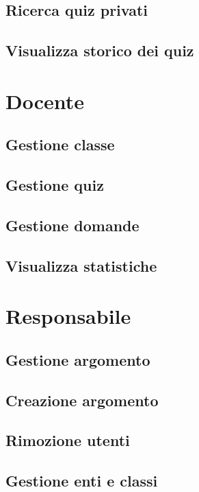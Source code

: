 \documentclass[a4paper, titlepage]{article}
\begin{document}
	 \subsection{Ricerca quiz privati}
	 
	 \subsection{Visualizza storico dei quiz}
	 
	 
	 \section{Docente}
	 
	 \subsection{Gestione classe}
	 
	 \subsection{Gestione quiz}
	 
	 \subsection{Gestione domande}
	 
	 \subsection{Visualizza statistiche}
	 
	 
	 \section{Responsabile}
	 
	 \subsection{Gestione argomento}
	 
	 \subsection{Creazione argomento}
	 
	 \subsection{Rimozione utenti}
	 
	 \subsection{Gestione enti e classi}
	 
	
\end{document}
